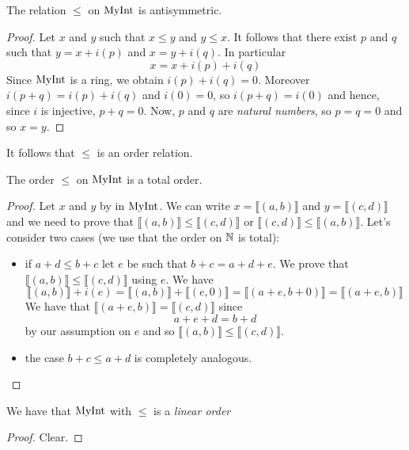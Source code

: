 \begin{lemma}
    \label{MyInt.le_antisymm}
    \leanok
    The relation $\leq$ on $\mathrm{MyInt}$ is antisymmetric.
\end{lemma}
\begin{proof}
    \leanok
    Let $x$ and $y$ such that $x \leq y$ and $y \leq x$. It follows that there exist $p$ and $q$
    such that $y = x + i(p)$ and $x = y + i(q)$. In particular
    \[
    x = x + i(p) + i(q)
    \]
    Since $\mathrm{MyInt}$ is a ring, we obtain $i(p)+i(q) = 0$. Moreover $i(p+q)=i(p)+i(q)$ and $i(0)=0$, so
    $i(p+q)=i(0)$ and hence, since $i$ is injective, $p+q = 0$. Now, $p$ and $q$ are \emph{natural numbers}, so $p=q=0$ and so $x=y$.
\end{proof}

It follows that $\leq$ is an order relation.

\begin{lemma}
    \label{MyInt.le_total}
    \leanok
    The order $\leq$ on $\mathrm{MyInt}$ is a total order.
\end{lemma}
\begin{proof}
    \leanok
    Let $x$ and $y$ by in $\mathrm{MyInt}$. We can write $x = ⟦ (a,b) ⟧$ and
    $y = ⟦ (c,d) ⟧$ and we need to prove that
    $⟦ (a,b) ⟧ \leq ⟦ (c,d) ⟧$ or $⟦ (c,d) ⟧ \leq ⟦ (a,b) ⟧$. Let's consider two cases (we use that the order on $\mathbb{N}$ is total):
    \begin{itemize}
        \item if $a + d \leq b + c$ let $e$ be such that $b + c = a + d + e$. We prove that
        $⟦ (a,b) ⟧ \leq ⟦ (c,d) ⟧$ using $e$. We have
        \[
        ⟦ (a,b) ⟧+i(e) = ⟦ (a,b) ⟧ + ⟦ (e,0) ⟧
        = ⟦ (a+e,b+0) ⟧ = ⟦ (a+e,b) ⟧
        \]
        We have that $⟦ (a+e,b) ⟧ = ⟦ (c,d) ⟧$ since
        \[
        a+e+d=b+d
        \]
        by our assumption on $e$ and so $⟦ (a,b) ⟧ \leq ⟦ (c,d) ⟧$.
        \item the case $b + c \leq a + d$ is completely analogous.
    \end{itemize}
\end{proof}

\begin{lemma}
    \label{MyInt.linearOrder}
    \leanok
    We have that $\mathrm{MyInt}$ with $\leq$ is a \emph{linear order}
\end{lemma}
\begin{proof}
    \leanok
    Clear.
\end{proof}

